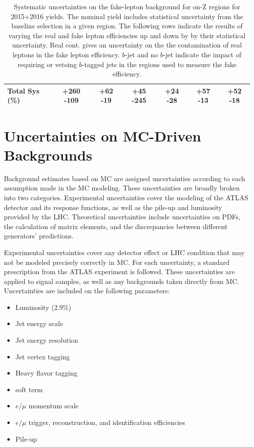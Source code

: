 \begin{table}[!hbt]
{\begin{tabular}{l|cccccc}
Total Sys (\%) & +260 -109 	& +62 -19 & +45 -245 & +24 -28 & +57 -13 	& +52 -18  \\
\hline\hline
\end{tabular}
}
\caption{ Systematic uncertainties on the fake-lepton background for on-Z regions for 2015+2016 yields. The nominal yield includes statistical uncertainty from the baseline selection in a given region. The following rows indicate the results of varying the real and fake lepton efficiencies up and down by by their statistical uncertainty. Real cont. gives an uncertainty on the the contamination of real leptons in the fake lepton efficiency. $b$-jet and no $b$-jet indicate the impact of requiring or vetoing $b$-tagged jets in the regions used to measure the fake efficiency. \label{tab:syst:fakes_onz1516}}
\end{table}


\section{Uncertainties on \acs{MC}-Driven Backgrounds}

Background estimates based on \ac{MC} are assigned uncertainties according to each assumption made in the \ac{MC} modeling. These uncertainties are broadly broken into two categories. Experimental uncertainties cover the modeling of the \ac{ATLAS} detector and its response functions, as well as the pile-up and luminosity provided by the \ac{LHC}. Theoretical uncertainties include uncertainties on \acp{PDF}, the calculation of matrix elements, and the discrepancies between different generators' predictions.

Experimental uncertainties cover any detector effect or \ac{LHC} condition that may not be modeled precisely correctly in \ac{MC}. For each uncertainty, a standard prescription from the \ac{ATLAS} experiment is followed. These uncertainties are applied to signal samples, as well as any backgrounds taken directly from \ac{MC}. Uncertainties are included on the following parameters:  
\begin{itemize}
\item Luminosity (2.9\%) \cite{2011lumi,2012lumi}
\item Jet energy scale \cite{ATL-PHYS-PUB-2015-015}
\item Jet energy resolution \cite{ATL-PHYS-PUB-2015-015}
\item Jet vertex tagging
\item Heavy flavor tagging
\item \met soft term \cite{ATL-PHYS-PUB-2015-023}
\item $e/\mu$ momentum scale  
\item $e/\mu$ trigger, reconstruction, and identification efficiencies
\item Pile-up
\end{itemize}

